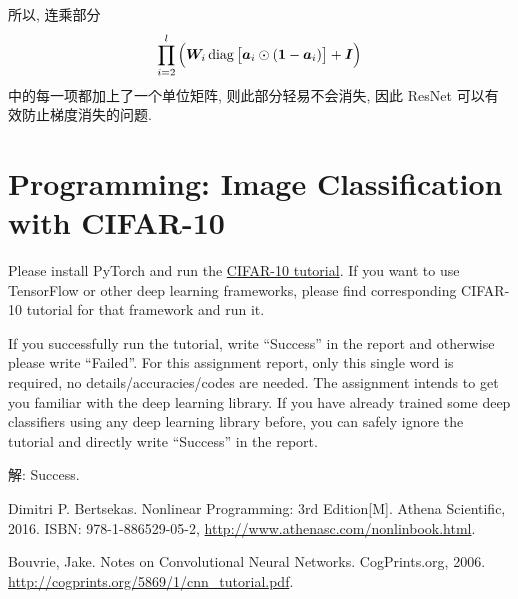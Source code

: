 \documentclass{article}
\begin{document}
所以, 连乘部分 $$\prod_{i=2}^l\Big(\bm{W}_i\operatorname{diag}\big[\bm{a}_i\odot(\bm{1}-\bm{a}_i)\big]+\bm{I}\Big)$$ 中的每一项都加上了一个单位矩阵, 则此部分轻易不会消失, 因此 ResNet 可以有效防止梯度消失的问题.

\section*{Programming: Image Classification with CIFAR-10}

Please install PyTorch and run the \href{https://pytorch.org/tutorials/beginner/blitz/cifar10_tutorial.html}{CIFAR-10 tutorial}.
If you want to use TensorFlow or other deep learning frameworks, please find corresponding CIFAR-10 tutorial for that framework and run it.

If you successfully run the tutorial, write ``Success'' in the report and otherwise please write ``Failed''.
For this assignment report, only this single word is required, no details/accuracies/codes are needed. 
The assignment intends to get you familiar with the deep learning library.
If you have already trained some deep classifiers using any deep learning library before, you can safely ignore the tutorial and directly write ``Success'' in the report.

解: Success.

\begin{thebibliography}{1}

Dimitri P. Bertsekas. Nonlinear Programming: 3rd Edition[M]. Athena Scientific, 2016. ISBN: 978-1-886529-05-2, \url{http://www.athenasc.com/nonlinbook.html}.

Bouvrie, Jake. Notes on Convolutional Neural Networks. CogPrints.org, 2006. \url{http://cogprints.org/5869/1/cnn_tutorial.pdf}.

\end{thebibliography}
\end{document}
